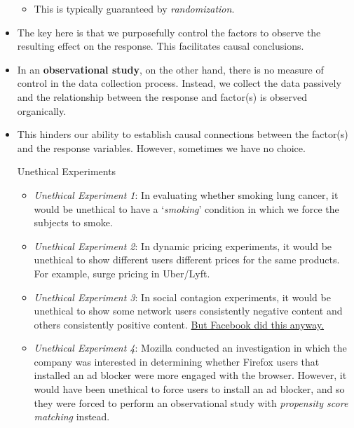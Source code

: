 \begin{itemize}
\begin{itemize}
                  \item This is typically guaranteed by \emph{randomization}.
            \end{itemize}
      \item The key here is that we purposefully control the factors to
            observe the resulting effect on the response. This facilitates causal conclusions.
      \item In an \textbf{observational study}, on the other hand, there is no measure of control
            in the data collection process. Instead, we collect the data passively and
            the relationship between the response and factor(s) is observed organically.
      \item This hinders our ability to establish causal connections between the factor(s)
            and the response variables. However, sometimes we have no choice.
            \begin{Example}{Unethical Experiments}{}
                  \begin{itemize}
                        \item \emph{Unethical Experiment 1}: In evaluating whether smoking lung cancer,
                              it would be unethical to have a `\emph{smoking}' condition in which we force the
                              subjects to smoke.
                        \item \emph{Unethical Experiment 2}: In dynamic pricing experiments, it would be unethical
                              to show different users different prices for the same products. For example, surge pricing
                              in Uber/Lyft.
                        \item \emph{Unethical Experiment 3}: In social contagion experiments, it would be unethical
                              to show some network users consistently negative content and others consistently positive content.
                              \href{https://slate.com/technology/2014/06/facebook-unethical-experiment-it-made-news-feeds-happier-or-sadder-to-manipulate-peoples-emotions.html}{But Facebook did this anyway.}
                        \item \emph{Unethical Experiment 4}: Mozilla conducted an investigation in which
                              the company was interested in determining whether Firefox users that installed an ad blocker
                              were more engaged with the browser. However, it would have been unethical to force users to install
                              an ad blocker, and so they were forced to perform an observational study with \emph{propensity score matching}
                              instead.
                  \end{itemize}
            \end{Example}
\end{itemize}
